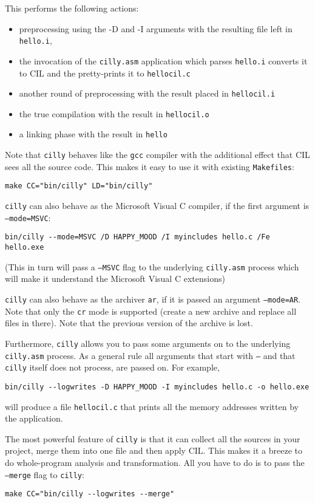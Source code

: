 \documentclass{article}
\def\t#1{{\tt #1}}
\begin{document}
 This performs the following actions: 
\begin{itemize}
\item preprocessing using the -D and -I arguments with the resulting file left in \t{hello.i}, 
\item the invocation of the \t{cilly.asm} application which parses \t{hello.i}
converts it to CIL and the pretty-prints it to \t{hellocil.c}
\item another round of preprocessing with the result placed in \t{hellocil.i}
\item the true compilation with the result in \t{hellocil.o}
\item a linking phase with the result in \t{hello}
\end{itemize}
 
 Note that \t{cilly} behaves like the \t{gcc} compiler with the additional
effect that CIL sees all the source code. This makes it easy
to use it with existing \t{Makefiles}:
\begin{verbatim}
make CC="bin/cilly" LD="bin/cilly"
\end{verbatim}

 \t{cilly} can also behave as the Microsoft Visual C compiler, if the first
 argument is \t{--mode=MSVC}:
\begin{verbatim}
bin/cilly --mode=MSVC /D HAPPY_MOOD /I myincludes hello.c /Fe hello.exe
\end{verbatim}

 (This in turn will pass a \t{--MSVC} flag to the underlying \t{cilly.asm}
 process which will make it understand the Microsoft Visual C extensions)

 \t{cilly} can also behave as the archiver \t{ar}, if it is passed an
argument \t{--mode=AR}. Note that only the \t{cr} mode is supported (create a
new archive and replace all files in there). Note that the previous version of
the archive is lost. 

 Furthermore, \t{cilly} allows you to pass some arguments on to the
underlying \t{cilly.asm} process. As a general rule all arguments that start
with \t{--} and that \t{cilly} itself does not process, are passed on. For
example, 
\begin{verbatim}
bin/cilly --logwrites -D HAPPY_MOOD -I myincludes hello.c -o hello.exe
\end{verbatim}

 will produce a file \t{hellocil.c} that prints all the memory addresses
written by the application. 

 The most powerful feature of \t{cilly} is that it can collect all the
sources in your project, merge them into one file and then apply CIL. This
makes it a breeze to do whole-program analysis and transformation. All you
have to do is to pass the \t{--merge} flag to \t{cilly}:
\begin{verbatim}
make CC="bin/cilly --logwrites --merge"
\end{verbatim}
\end{document}
